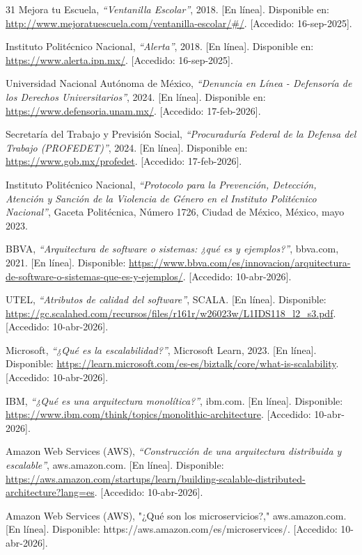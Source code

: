 \begin{thebibliography}{31}
Mejora tu Escuela, \textit{``Ventanilla Escolar''}, 2018. [En línea]. Disponible en: \url{http://www.mejoratuescuela.com/ventanilla-escolar/\#/}. [Accedido: 16-sep-2025].

Instituto Politécnico Nacional, \textit{``Alerta''}, 2018. [En línea]. Disponible en: \url{https://www.alerta.ipn.mx/}. [Accedido: 16-sep-2025].

Universidad Nacional Autónoma de México, \textit{``Denuncia en Línea - Defensoría de los Derechos Universitarios''}, 2024. [En línea]. Disponible en: \url{https://www.defensoria.unam.mx/}. [Accedido: 17-feb-2026].

Secretaría del Trabajo y Previsión Social, \textit{``Procuraduría Federal de la Defensa del Trabajo (PROFEDET)''}, 2024. [En línea]. Disponible en: \url{https://www.gob.mx/profedet}. [Accedido: 17-feb-2026].

Instituto Politécnico Nacional, \textit{``Protocolo para la Prevención, Detección, Atención y Sanción de la Violencia de Género en el Instituto Politécnico Nacional''}, Gaceta Politécnica, Número 1726, Ciudad de México, México, mayo 2023.

BBVA, \textit{``Arquitectura de software o sistemas: ¿qué es y ejemplos?''}, bbva.com, 2021. [En línea]. Disponible: \url{https://www.bbva.com/es/innovacion/arquitectura-de-software-o-sistemas-que-es-y-ejemplos/}. [Accedido: 10-abr-2026].

UTEL, \textit{``Atributos de calidad del software''}, SCALA. [En línea]. Disponible: \url{https://gc.scalahed.com/recursos/files/r161r/w26023w/L1IDS118_l2_s3.pdf}. [Accedido: 10-abr-2026].

Microsoft, \textit{``¿Qué es la escalabilidad?''}, Microsoft Learn, 2023. [En línea]. Disponible: \url{https://learn.microsoft.com/es-es/biztalk/core/what-is-scalability}. [Accedido: 10-abr-2026].

IBM, \textit{``¿Qué es una arquitectura monolítica?''}, ibm.com. [En línea]. Disponible: \url{https://www.ibm.com/think/topics/monolithic-architecture}. [Accedido: 10-abr-2026].

Amazon Web Services (AWS), \textit{``Construcción de una arquitectura distribuida y escalable''}, aws.amazon.com. [En línea]. Disponible: \url{https://aws.amazon.com/startups/learn/building-scalable-distributed-architecture?lang=es}. [Accedido: 10-abr-2026].

Amazon Web Services (AWS), "¿Qué son los microservicios?," aws.amazon.com. [En línea]. Disponible: https://aws.amazon.com/es/microservices/. [Accedido: 10-abr-2026].


\end{thebibliography}
